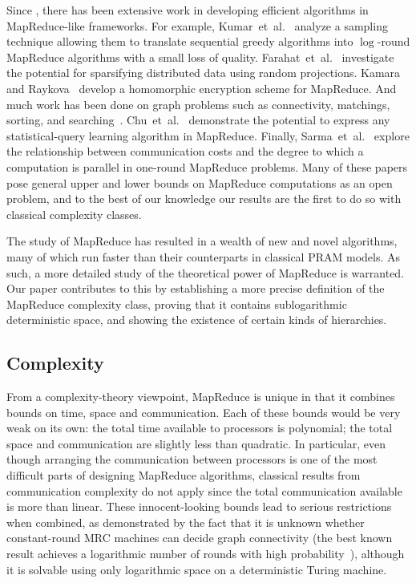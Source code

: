 \documentclass{llncs}
\begin{document}
Since \cite{Karloff10}, there has been extensive work in developing efficient
algorithms in MapReduce-like frameworks. For example,
Kumar~et~al.~\cite{KMVV13} analyze a sampling technique allowing them to
translate sequential greedy algorithms into $\log$-round MapReduce algorithms
with a small loss of quality.  Farahat~et~al.~\cite{FEGK13} investigate the
potential for sparsifying distributed data using random projections. Kamara and
Raykova~\cite{KR13} develop a homomorphic encryption scheme for MapReduce. And
much work has been done on graph problems such as connectivity, matchings,
sorting, and searching~\cite{GoodrichSZ11}. Chu~et~al.~\cite{ChuKLYBNO06}
demonstrate the potential to express any statistical-query learning algorithm
in MapReduce.  Finally, Sarma~et~al.~\cite{Sarma13} explore the relationship
between communication costs and the degree to which a computation is parallel
in one-round MapReduce problems. Many of these papers pose general upper and
lower bounds on MapReduce computations as an open problem, and to the best of
our knowledge our results are the first to do so with classical complexity
classes.

The study of MapReduce has resulted in a wealth of new and novel algorithms,
many of which run faster than their counterparts in classical PRAM models. As
such, a more detailed study of the theoretical power of MapReduce is warranted.
Our paper contributes to this by establishing a more precise definition of the
MapReduce complexity class, proving that it contains sublogarithmic
deterministic space, and showing the existence of certain kinds of hierarchies.

\subsection{Complexity}

From a complexity-theory viewpoint, MapReduce is unique in that it combines
bounds on time, space and communication. Each of these bounds would be very
weak on its own: the total time available to processors is polynomial; the
total space and communication are slightly less than quadratic.  In particular,
even though arranging the communication between processors is one of the most
difficult parts of designing MapReduce algorithms, classical results from
communication complexity do not apply since the total communication available
is more than linear. These innocent-looking bounds lead to serious restrictions
when combined, as demonstrated by the fact that it is unknown whether
constant-round MRC machines can decide graph connectivity (the best known
result achieves a logarithmic number of rounds with high
probability~\cite{Karloff10}), although it is solvable using only logarithmic
space on a deterministic Turing machine.
\end{document}
